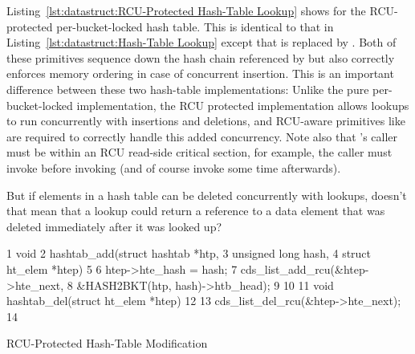 Listing~\ref{lst:datastruct:RCU-Protected Hash-Table Lookup}
shows  for the RCU-protected per-bucket-locked
hash table.
This is identical to that in
Listing~\ref{lst:datastruct:Hash-Table Lookup}
except that  is replaced
by .
Both of these primitives sequence down the hash chain referenced
by  but  also
correctly enforces memory ordering in case of concurrent insertion.
This is an important difference between these two hash-table implementations:
Unlike the pure per-bucket-locked implementation, the RCU protected
implementation allows lookups to run concurrently with insertions
and deletions, and RCU-aware primitives like
 are required to correctly handle
this added concurrency.
Note also that 's caller must be within an
RCU read-side critical section, for example, the caller must invoke
 before invoking 
(and of course invoke  some time afterwards).

\QuickQuiz{}
	But if elements in a hash table can be deleted concurrently
	with lookups, doesn't that mean that a lookup could return
	a reference to a data element that was deleted immediately
	after it was looked up?
 \QuickQuizEnd

\begin{listing}[tb]
{ \scriptsize
\begin{verbbox}
 1 void
 2 hashtab_add(struct hashtab *htp,
 3             unsigned long hash,
 4             struct ht_elem *htep)
 5 {
 6   htep->hte_hash = hash;
 7   cds_list_add_rcu(&htep->hte_next,
 8                    &HASH2BKT(htp, hash)->htb_head);
 9 }
10 
11 void hashtab_del(struct ht_elem *htep)
12 {
13   cds_list_del_rcu(&htep->hte_next);
14 }
\end{verbbox}
}
\centering
\theverbbox
\caption{RCU-Protected Hash-Table Modification}
\label{lst:datastruct:RCU-Protected Hash-Table Modification}
\end{listing}

